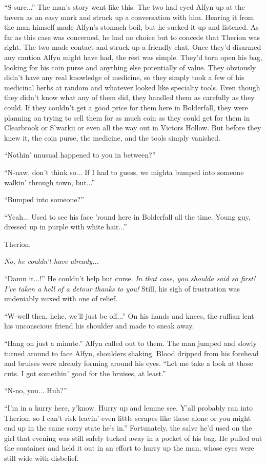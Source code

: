 ``S-sure...'' The man's story went like this. The two had eyed Alfyn up at the tavern as an easy mark and struck up a conversation with him. Hearing it from the man himself made Alfyn's stomach boil, but he sucked it up and listened. As far as this case was concerned, he had no choice but to concede that Therion was right. The two made contact and struck up a friendly chat. Once they'd disarmed any caution Alfyn might have had, the rest was simple. They'd torn open his bag, looking for his coin purse and anything else potentially of value. They obviously didn't have any real knowledge of medicine, so they simply took a few of his medicinal herbs at random and whatever looked like specialty tools. Even though they didn't know what any of them did, they handled them as carefully as they could. If they couldn't get a good price for them here in Bolderfall, they were planning on trying to sell them for as much coin as they could get for them in Clearbrook or S'warkii or even all the way out in Victors Hollow. But before they knew it, the coin purse, the medicine, and the tools simply vanished.

``Nothin' unusual happened to you in between?''

``N-naw, don't think so... If I had to guess, we mighta bumped into someone walkin' through town, but...''

``Bumped into someone?''

``Yeah... Used to see his face 'round here in Bolderfall all the time. Young guy, dressed up in purple with white hair...''

Therion.

\emph{No, he couldn't have already...}

``Damn it...!'' He couldn't help but curse. \emph{In that case, you shoulda said so first! I've taken a hell of a detour thanks to you!} Still, his sigh of frustration was undeniably mixed with one of relief.

``W-well then, hehe, we'll just be off...'' On his hands and knees, the ruffian lent his unconscious friend his shoulder and made to sneak away.

``Hang on just a minute.'' Alfyn called out to them. The man jumped and slowly turned around to face Alfyn, shoulders shaking. Blood dripped from his forehead and bruises were already forming around his eyes. ``Let me take a look at those cuts. I got somethin' good for the bruises, at least.''

``N-no, you... Huh?''

``I'm in a hurry here, y'know. Hurry up and lemme see. Y'all probably ran into Therion, so I can't risk leavin' even little scrapes like these alone or you might end up in the same sorry state he's in.'' Fortunately, the salve he'd used on the girl that evening was still safely tucked away in a pocket of his bag. He pulled out the container and held it out in an effort to hurry up the man, whose eyes were still wide with disbelief.


